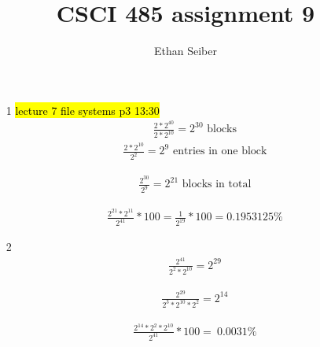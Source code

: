 \documentclass[12pt]{article}
\author{Ethan Seiber}
\title{CSCI 485 assignment 9}
\begin{document}
\maketitle

\begin{enumerate}
\item[1] \hl{lecture 7 file systems p3 13:30}
	\begin{align*}%
	\frac{2*2^{40}}{2*2^{10}}= 2^{30}\text{ blocks}
	\end{align*}
	\begin{align*}%
	\frac{2*2^{10}}{2^2} = 2^9\text{ entries in one block}
	\end{align*}
	
	\begin{align*}%
	\frac{2^{30}}{2^9} = 2^{21}\text{ blocks in total}
	\end{align*}
	
	\begin{align*}
	\frac{2^{21}*2^{11}}{2^{41}}*100 = \frac{1}{2^{19}}*100 = 0.1953125\%
	\end{align*}

      \item[2]
        \begin{align*}%
          \frac{2^{41}}{2^2*2^{10}} = 2^{29}
          \end{align*}

        \begin{align*}%
          \frac{2^{29}}{2^3*2^{10}*2^2} = 2^{14}
        \end{align*}

        \begin{align*}%
          \frac{2^{14}*2^2*2^{10}}{2^{41}}*100 = ~0.0031\%
          \end{align*}
\end{enumerate}
\end{document}

